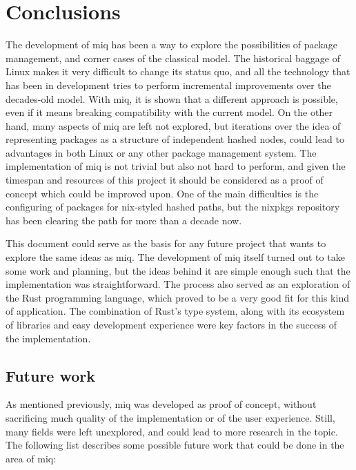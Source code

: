 \chapter{Conclusions}

The development of miq has been a way to
explore the possibilities of package management,
and corner cases of the classical model. The
historical baggage of Linux makes it very difficult
to change its status quo, and all the technology
that has been in development tries to perform
incremental improvements over the decades-old
model. With miq, it is shown that a different
approach is possible, even if it means breaking
compatibility with the current model. On the
other hand, many aspects of miq are left not
explored, but iterations over the idea of representing
packages as a structure of independent hashed
nodes, could lead to advantages in both Linux or
any other package management system.
The implementation of miq is not trivial but also not hard
to perform, and given the timespan and resources of this
project it should be considered as a proof of concept which
could be improved upon. One of the main difficulties is the
configuring of packages for nix-styled hashed paths, but the
nixpkgs repository has been clearing the path for more than
a decade now.

This document could serve as the basis for any future project
that wants to explore the same ideas as miq. The
development of miq itself turned out to take some work
and planning, but the ideas behind it are simple enough
such that the implementation was straightforward. The
process also served as an exploration of the Rust
programming language, which proved to be a very good fit for
this kind of application. The combination of Rust's type
system, along with its ecosystem of libraries and easy
development experience were key factors in the success of
the implementation.

\section{Future work}

As mentioned previously, miq was developed as proof of
concept, without sacrificing much quality of the
implementation or of the user experience. Still, many fields
were left unexplored, and could lead to more research in the
topic. The following list describes some possible
future work that could be done in the area of miq:

